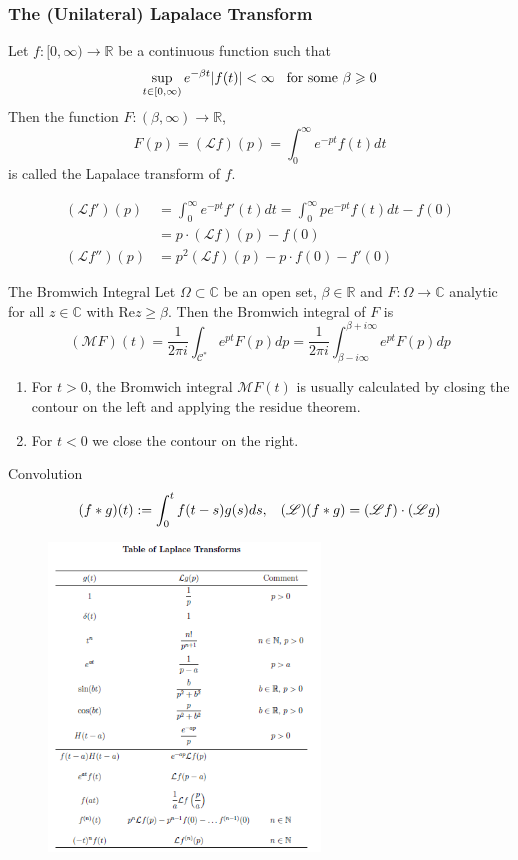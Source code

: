 \documentclass{beamer}
\begin{document}
\begin{frame}
\frametitle{The (Unilateral) Lapalace Transform}
Let $f:[0,\infty)\rightarrow\mathbb{R}$ be a continuous function such that
$$\sup_{t\in[0,\infty)}e^{-\beta t}|f(t)|<\infty\hspace{3mm}\text{for some }\beta\geqslant0$$
Then the function $F:(\beta,\infty)\rightarrow\mathbb{R}$,
$$F(p)=(\mathscr{L} f)(p)=\int_0^{\infty}e^{-pt}f(t)dt$$
is called the Lapalace transform of $f$.

\begin{align*}
(\mathscr{L}f')(p)&=\int_0^{\infty}e^{-pt}f'(t)dt=\int_0^{\infty}pe^{-pt}f(t)dt-f(0)\\
&=p\cdot(\mathscr{L}f)(p)-f(0)\\
(\mathscr{L}f'')(p)&=p^2(\mathscr{L}f)(p)-p\cdot f(0)-f'(0)
\end{align*}
\end{frame}
\begin{frame}
\begin{block}{The Bromwich Integral}
Let $\Omega \subset \mathbb{C}$ be an open set, $\beta\in \mathbb{R}$ and $F :\Omega \rightarrow\mathbb{C}$ analytic for all $z \in \mathbb{C}$ with $\text{Re} z \geqslant\beta$. Then the Bromwich integral of $F$ is
$$(\mathscr{M}F)(t) =\dfrac{1}{2\pi i}\int_{\mathcal{C}^*}e^{pt}F(p) dp=\dfrac{1}{2\pi i}\int_{\beta-i\infty}^{\beta+i\infty}e^{pt}F(p) dp$$
\begin{enumerate}
\item For $t > 0$, the Bromwich integral $\mathscr{M}F(t)$ is usually calculated by closing the contour on the left and applying the residue theorem.
\item For $t < 0$ we close the contour on the right.
\end{enumerate}
\end{block}
\begin{block}{Convolution}
$$(f * g)(t) :=\int^t_0f (t-s)g(s) ds,\hspace{3mm}(\mathscr{L})(f*g)=(\mathscr{L}f)\cdot(\mathscr{L} g)$$
\end{block}
\end{frame}

\begin{frame}
\begin{figure}[h]
    \centering
    \includegraphics[height=8.2cm]{lapalace.png}
\end{figure}
\end{frame}
\end{document}
